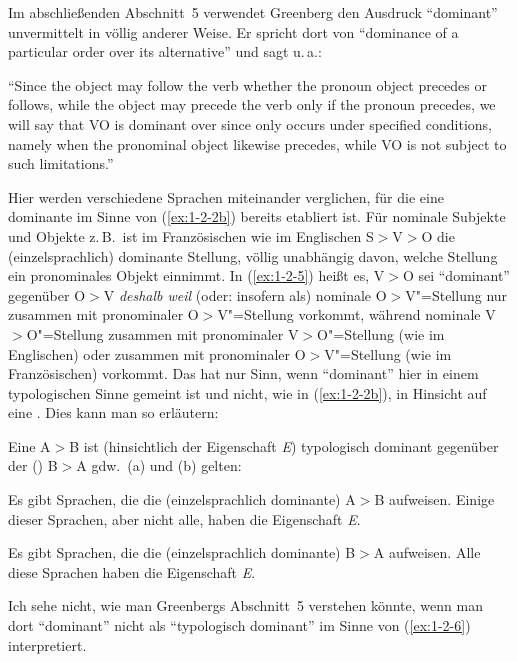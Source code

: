 \documentclass[output=paper]{langsci/langscibook}
\begin{document}
\ssubsection{}%
\label{subsec:1-2.2}
Im abschließenden Abschnitt~5 verwendet Greenberg den Ausdruck "`dominant"' unvermittelt in völlig anderer Weise. Er spricht dort von "`dominance of a particular order over its alternative"' und sagt u.\,a.:
\begin{exe}
\ex\label{ex:1-2-5}
"`Since the  object may follow the verb whether the pronoun object
precedes or follows, while the  object may precede the verb only if
the pronoun precedes, we will say that VO is dominant over  since 
only occurs under specified conditions, namely when the pronominal object
likewise precedes, while VO is not subject to such limitations."' \citep[97]{Greenberg1963}
\end{exe}
Hier werden verschiedene Sprachen miteinander verglichen, für die eine dominante
 im Sinne von (\ref{ex:1-2-2b}) bereits etabliert ist. Für nominale Subjekte und Objekte z.\,B.\ ist im Französischen wie im Englischen S$>$V$>$O die (einzelsprachlich) dominante Stellung, völlig unabhängig davon, welche Stellung ein pronominales Objekt einnimmt. In (\ref{ex:1-2-5}) heißt es, V$>$O sei "`dominant"' gegenüber O$>$V \textit{deshalb weil} (oder: insofern als) nominale O$>$V"=Stellung nur zusammen mit pronominaler O$>$V"=Stellung
vorkommt, während nominale V$>$O"=Stellung zusammen mit pronominaler V$>$O"=Stellung (wie im Englischen) oder zusammen mit pronominaler O$>$V"=Stellung (wie
im Französischen) vorkommt. Das hat nur Sinn, wenn "`dominant"' hier in einem typologischen Sinne gemeint ist und nicht, wie in (\ref{ex:1-2-2b}), in Hinsicht auf eine . Dies kann man so erläutern:
\begin{exe}
\ex\label{ex:1-2-6}
Eine  A$>$B ist (hinsichtlich der Eigenschaft \emph{E}) typologisch dominant gegenüber der ()  B$>$A gdw.\ (a) und (b)
gelten:
\begin{xlist}
\ex\label{ex:1-2-6a} 
\begin{xlist}
\ex\label{ex:1-2-6ai} Es gibt Sprachen, die die (einzelsprachlich dominante) 
A$>$B aufweisen.
\ex\label{ex:1-2-6aii} Einige dieser Sprachen, aber nicht alle, haben die Eigenschaft \emph{E}.
\end{xlist}
\ex\label{ex:1-2-6b} 
\begin{xlist}
\ex\label{ex:1-2-6bi} Es gibt Sprachen, die die (einzelsprachlich dominante) 
B$>$A aufweisen.
\ex\label{ex:1-2-6bii} Alle diese Sprachen haben die Eigenschaft \emph{E}.
\end{xlist}
\end{xlist}
\end{exe}
Ich sehe nicht, wie man Greenbergs Abschnitt~5 verstehen könnte, wenn man dort
"`dominant"' nicht als "`typologisch dominant"' im Sinne von (\ref{ex:1-2-6}) interpretiert.
\end{document}

